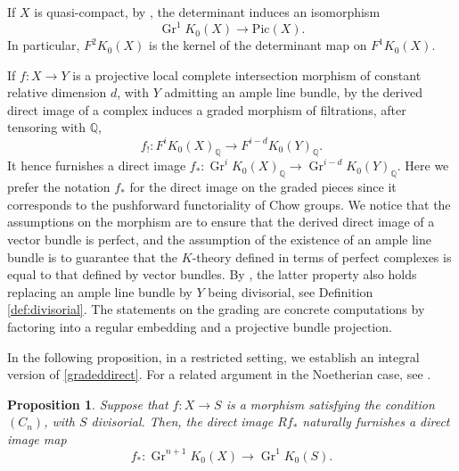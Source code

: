 \documentclass[11pt]{article}
\theoremstyle{plain}
\newtheorem{proposition}[theorem]{Proposition}
\theoremstyle{definition}
\newcommand{\QBbb}{\mathbb Q}
\newcommand{\Pic}{\mathrm{Pic}}
\DeclareMathOperator{\Gr}{Gr}
\begin{document}
If $X$ is quasi-compact, by \cite[Exp.\,X, Th.\,5.3.2]{SGA6}, the determinant induces an isomorphism
\begin{equation}\label{iso:GR1}
\Gr^1 K_0(X)\to \Pic(X).
\end{equation}
In particular, $F^{2}K_{0}(X)$ is the kernel of the determinant map on $F^{1}K_{0}(X)$.

If $f: X \to Y$ is a projective local complete intersection morphism of constant relative dimension $d$, with $Y$ admitting an ample line bundle, by \cite[Exp.\,VIII, Prop.\,3.2]{SGA6} the derived direct image of a complex induces a graded morphism of filtrations, after tensoring with $\QBbb$,
\begin{equation}\label{gradeddirect}
f_!: F^i K_0(X)_\QBbb \to F^{i-d}K_0(Y)_\QBbb.
\end{equation}
It hence furnishes a direct image $f_\ast: \Gr^iK_0(X)_{\QBbb}\to \Gr^{i-d}K_0(Y)_\QBbb$. Here we prefer the notation $f_{\ast}$ for the direct image on the graded pieces since it corresponds to the pushforward functoriality of Chow groups. We notice that the assumptions on the morphism are to ensure that the derived direct image of a vector bundle is perfect, and the assumption of the existence of an ample line bundle is to guarantee that the $K$-theory defined in terms of perfect complexes is equal to that defined by vector bundles. By \cite[Prop.\,3.10]{ThomasonTrobaugh}, the latter property also holds replacing an ample line bundle by $Y$ being divisorial, see Definition \ref{def:divisorial}. The statements on the grading are concrete computations by factoring into a regular embedding and a projective bundle projection.

In the following proposition, in a restricted setting, we establish an integral version of \eqref{gradeddirect}. For a related argument in the Noetherian case, see \cite[Prop.\,2.25]{Nakayamaintsheaves}.

\begin{proposition}\label{prop:directimageK}
Suppose that $f: X\to S$ is a morphism satisfying the condition $(C_n)$, with $S$ divisorial. Then, the direct image $Rf_\ast$ naturally furnishes a direct image map\vspace*{-3pt}
\begin{displaymath} f_\ast : \Gr^{n+1} K_0(X) \to \Gr^1 K_0(S).
\end{displaymath}
\end{proposition}
\end{document}
